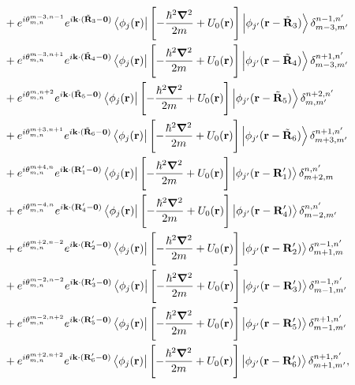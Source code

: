 \documentclass{report}
\newcommand{\f}[2]{\dfrac{#1}{#2}}
\begin{document}
\begin{equation}
\begin{aligned}
		 & + e^{i\theta_{m,n}^{m-3,n-1}}e^{i\mathbf{k} \cdot (\tilde{\mathbf{R}}_{3}-\mathbf{0})} \bra{\phi_{j}(\mathbf{r})} \left[-\f{\hbar^{2} \boldsymbol{\nabla}^{2}}{2m} + U_{0}(\mathbf{r})\right] \ket{\phi_{j'}(\mathbf{r}-\tilde{\mathbf{R}}_{3})}\delta_{m-3,m'}^{n-1,n'} \\
		 & + e^{i\theta_{m,n}^{m-3,n+1}}e^{i\mathbf{k} \cdot (\tilde{\mathbf{R}}_{4}-\mathbf{0})} \bra{\phi_{j}(\mathbf{r})} \left[-\f{\hbar^{2} \boldsymbol{\nabla}^{2}}{2m} + U_{0}(\mathbf{r})\right] \ket{\phi_{j'}(\mathbf{r}-\tilde{\mathbf{R}}_{4})}\delta_{m-3,m'}^{n+1,n'} \\
		 & + e^{i\theta_{m,n}^{m,n+2}}e^{i\mathbf{k} \cdot (\tilde{\mathbf{R}}_{5}-\mathbf{0})} \bra{\phi_{j}(\mathbf{r})} \left[-\f{\hbar^{2} \boldsymbol{\nabla}^{2}}{2m} + U_{0}(\mathbf{r})\right] \ket{\phi_{j'}(\mathbf{r}-\tilde{\mathbf{R}}_{5})}\delta_{m,m'}^{n+2,n'} \\
		 & + e^{i\theta_{m,n}^{m+3,n+1}}e^{i\mathbf{k} \cdot (\tilde{\mathbf{R}}_{6}-\mathbf{0})} \bra{\phi_{j}(\mathbf{r})} \left[-\f{\hbar^{2} \boldsymbol{\nabla}^{2}}{2m} + U_{0}(\mathbf{r})\right] \ket{\phi_{j'}(\mathbf{r}-\tilde{\mathbf{R}}_{6})}\delta_{m+3,m'}^{n+1,n'} \\
		 & + e^{i\theta_{m,n}^{m+4,n}}e^{i\mathbf{k} \cdot (\mathbf{R}'_{1} - \mathbf{0})} \bra{\phi_{j}(\mathbf{r})} \left[-\f{\hbar^{2} \boldsymbol{\nabla}^{2}}{2m} + U_{0}(\mathbf{r})\right] \ket{\phi_{j'}(\mathbf{r}-\mathbf{R}'_{1})}\delta_{m+2,m}^{n,n'}     \\
		 & + e^{i\theta_{m,n}^{m-4,n}}e^{i\mathbf{k} \cdot (\mathbf{R}'_{4} - \mathbf{0})} \bra{\phi_{j}(\mathbf{r})} \left[-\f{\hbar^{2} \boldsymbol{\nabla}^{2}}{2m} + U_{0}(\mathbf{r})\right] \ket{\phi_{j'}(\mathbf{r}-\mathbf{R}'_{4})}\delta_{m-2,m'}^{n,n'}    \\
		 & + e^{i\theta_{m,n}^{m+2,n-2}}e^{i\mathbf{k} \cdot (\mathbf{R}'_{2} - \mathbf{0})} \bra{\phi_{j}(\mathbf{r})} \left[-\f{\hbar^{2} \boldsymbol{\nabla}^{2}}{2m} + U_{0}(\mathbf{r})\right] \ket{\phi_{j'}(\mathbf{r}-\mathbf{R}'_{2})}\delta_{m+1,m}^{n-1,n'} \\
		 & + e^{i\theta_{m,n}^{m-2,n-2}}e^{i\mathbf{k} \cdot (\mathbf{R}'_{3}-\mathbf{0})} \bra{\phi_{j}(\mathbf{r})} \left[-\f{\hbar^{2} \boldsymbol{\nabla}^{2}}{2m} + U_{0}(\mathbf{r})\right] \ket{\phi_{j'}(\mathbf{r}-\mathbf{R}'_{3})}\delta_{m-1,m'}^{n-1,n'}  \\
		 & + e^{i\theta_{m,n}^{m-2,n+2}}e^{i\mathbf{k} \cdot (\mathbf{R}'_{5}-\mathbf{0})} \bra{\phi_{j}(\mathbf{r})} \left[-\f{\hbar^{2} \boldsymbol{\nabla}^{2}}{2m} + U_{0}(\mathbf{r})\right] \ket{\phi_{j'}(\mathbf{r}-\mathbf{R}'_{5})}\delta_{m-1,m'}^{n+1,n'}  \\
		 & + e^{i\theta_{m,n}^{m+2,n+2}}e^{i\mathbf{k} \cdot (\mathbf{R}'_{6}-\mathbf{0})} \bra{\phi_{j}(\mathbf{r})} \left[-\f{\hbar^{2} \boldsymbol{\nabla}^{2}}{2m} + U_{0}(\mathbf{r})\right] \ket{\phi_{j'}(\mathbf{r}-\mathbf{R}'_{6})}\delta_{m+1,m'}^{n+1,n'}, \\
	\end{aligned}
\end{equation}
\end{document}
